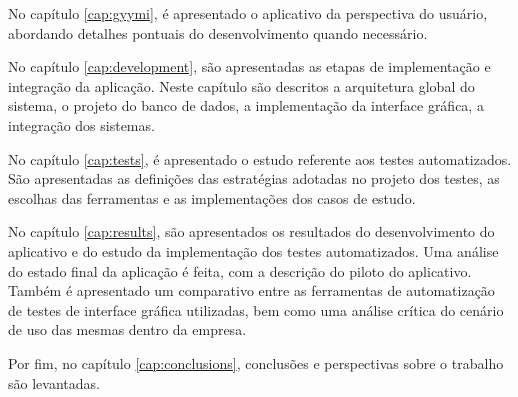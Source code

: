 No capítulo \ref{cap:gyymi}, é apresentado o aplicativo da perspectiva do usuário, abordando detalhes pontuais do desenvolvimento quando necessário.


No capítulo \ref{cap:development}, são apresentadas as etapas de implementação e integração da aplicação. Neste capítulo são descritos a arquitetura global do sistema, o projeto do banco de dados, a implementação da interface gráfica, a integração dos sistemas.

No capítulo \ref{cap:tests}, é apresentado o estudo referente aos testes automatizados. São apresentadas as definições das estratégias adotadas no projeto dos testes, as escolhas das ferramentas e as implementações dos casos de estudo.

No capítulo \ref{cap:results}, são apresentados os resultados do desenvolvimento do aplicativo e do estudo da implementação dos testes automatizados. Uma análise do estado final da aplicação é feita, com a descrição do piloto do aplicativo. Também é apresentado um comparativo entre as ferramentas de automatização de testes de interface gráfica utilizadas, bem como uma análise crítica do cenário de uso das mesmas dentro da empresa.

Por fim, no capítulo \ref{cap:conclusions}, conclusões e perspectivas sobre o trabalho são levantadas.
